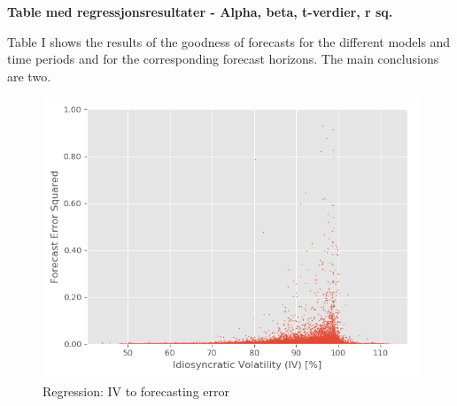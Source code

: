 \textbf{Table med regressjonsresultater - Alpha, beta, t-verdier, r sq.}

Table I shows the results of the goodness of forecasts for the different models and time periods and
for the corresponding forecast horizons. The main conclusions are two.

\begin{figure}[h]
    \centering
    \includegraphics[scale = 1]{Plot/ScatterRegression.png}
    \caption{Regression: IV to forecasting error}
    \label{visualization}
\end{figure}


